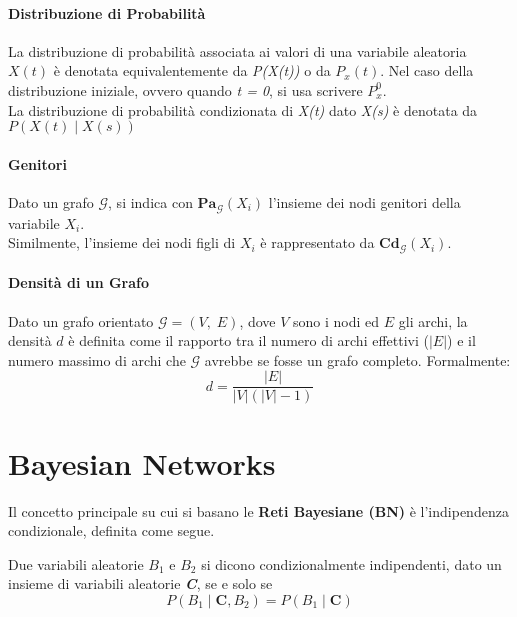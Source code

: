  \paragraph{Distribuzione di Probabilità}
  La distribuzione di probabilità associata ai valori di una variabile aleatoria \textit{$X(t)$} è denotata
  equivalentemente da \textit{P(X(t))} o da \textit{$P_{x}(t)$}. Nel caso della distribuzione iniziale, ovvero
  quando \textit{t = 0}, si usa scrivere \textit{$P_{x}^{0}$}.\\
  La distribuzione di probabilità condizionata di \textit{X(t)} dato \textit{X(s)} è denotata da
  $P(X(t) \; | \; X(s))$

  \paragraph{Genitori}
  Dato un grafo $\mathcal{G}$, si indica con $\mathbf{Pa}_{\mathcal{G}}(X_i)$ l'insieme dei nodi
  genitori della variabile \textit{$X_i$}.\\
  Similmente, l'insieme dei nodi figli di \textit{$X_i$} è rappresentato da $\mathbf{Cd}_{\mathcal{G}}(X_i)$.

  \paragraph{Densità di un Grafo} \cite{graphs}
  Dato un grafo orientato $\mathcal{G} = (V, \; E)$, dove $V$ sono i nodi ed $E$ gli archi, la densità $d$ è definita come
  il rapporto tra il numero di archi effettivi ($\lvert E \lvert$) e il numero massimo di archi che $\mathcal{G}$ avrebbe 
  se fosse un grafo completo. Formalmente:
  \begin{equation} \label{eq:density}
    d = \frac{\vert E \vert}{\vert V \vert (\vert V \vert - 1)}
  \end{equation}

  \section{Bayesian Networks} 
  Il concetto principale su cui si basano le \textbf{Reti Bayesiane (BN)} è l'indipendenza condizionale, 
  definita come segue.

  \begin{definition} \cite{conditional-independence}
    Due variabili aleatorie \textit{$B_1$} e \textit{$B_2$} si dicono condizionalmente indipendenti,
    dato un insieme di variabili aleatorie \textit{\textbf{C}}, se e solo se
    \begin{equation}
      P(B_1 \; | \; \bm{C}, B_2) = P(B_1 \; | \; \bm{C})
    \end{equation}
  \end{definition}

